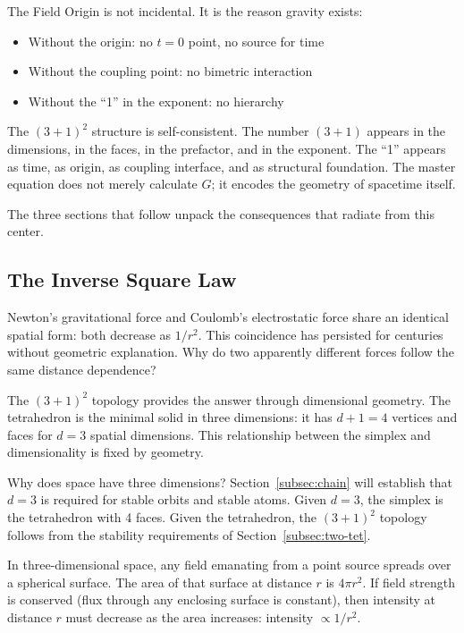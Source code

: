 \documentclass[aps,prd,preprint,superscriptaddress,showpacs,preprintnumbers,amsmath,amssymb,nofootinbib]{revtex4-2}
\begin{document}
The Field Origin is not incidental. It is the reason gravity exists:
\begin{itemize}
\item Without the origin: no $t = 0$ point, no source for time
\item Without the coupling point: no bimetric interaction
\item Without the ``1'' in the exponent: no hierarchy
\end{itemize}

The $(3+1)^2$ structure is self-consistent. The number $(3+1)$ appears in the dimensions, in the faces, in the prefactor, and in the exponent. The ``1'' appears as time, as origin, as coupling interface, and as structural foundation. The master equation does not merely calculate $G$; it encodes the geometry of spacetime itself.

The three sections that follow unpack the consequences that radiate from this center.

\subsection{The Inverse Square Law}
\label{subsec:inverse-square}

Newton's gravitational force and Coulomb's electrostatic force share an identical spatial form: both decrease as $1/r^2$. This coincidence has persisted for centuries without geometric explanation. Why do two apparently different forces follow the same distance dependence?

The $(3+1)^2$ topology provides the answer through dimensional geometry. The tetrahedron is the minimal solid in three dimensions: it has $d + 1 = 4$ vertices and faces for $d = 3$ spatial dimensions. This relationship between the simplex and dimensionality is fixed by geometry.

Why does space have three dimensions? Section~\ref{subsec:chain} will establish that $d = 3$ is required for stable orbits and stable atoms. Given $d = 3$, the simplex is the tetrahedron with 4 faces. Given the tetrahedron, the $(3+1)^2$ topology follows from the stability requirements of Section~\ref{subsec:two-tet}.

In three-dimensional space, any field emanating from a point source spreads over a spherical surface. The area of that surface at distance $r$ is $4\pi r^2$. If field strength is conserved (flux through any enclosing surface is constant), then intensity at distance $r$ must decrease as the area increases: intensity $\propto 1/r^2$.
\end{document}

